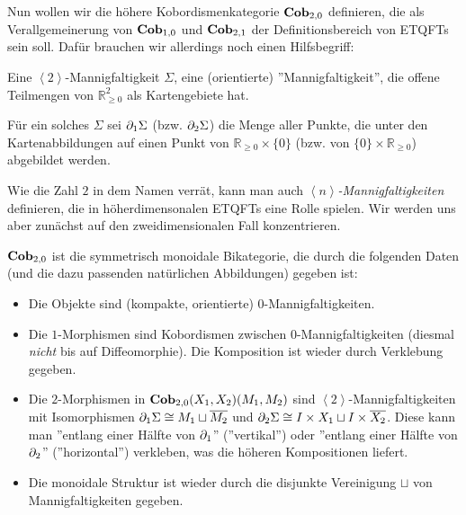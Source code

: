 

Nun wollen wir die höhere Kobordismenkategorie $\mathbf{Cob}_{2, 0}$
definieren, die als Verallgemeinerung von $\mathbf{Cob}_{1, 0}$ und
$\mathbf{Cob}_{2, 1}$ der Definitionsbereich von ETQFTs sein soll. Dafür
brauchen wir allerdings noch einen Hilfsbegriff:

\begin{Def}
Eine $\left<2\right>$-Mannigfaltigkeit $\Sigma$, eine (orientierte)
''Mannigfaltigkeit'', die offene Teilmengen von $\mathbb{R}_{\geq 0}^2$ als
Kartengebiete hat.

Für ein solches $\Sigma$ sei $\partial_1 \Sigma$ (bzw. $\partial_2 \Sigma$) die
Menge aller Punkte, die unter den Kartenabbildungen auf einen Punkt von
$\mathbb{R}_{\geq 0} \times \{0\}$ (bzw. von $\{0\} \times
\mathbb{R}_{\geq 0}$) abgebildet werden.
\end{Def}

Wie die Zahl $2$ in dem Namen verrät, kann man auch
\emph{$\left<n\right>$-Mannigfaltigkeiten} definieren, die in höherdimensonalen
ETQFTs eine Rolle spielen. Wir werden uns aber zunächst auf den
zweidimensionalen Fall konzentrieren.

\begin{Def}
$\mathbf{Cob}_{2, 0}$ ist die symmetrisch monoidale Bikategorie, die durch
die folgenden Daten (und die dazu passenden natürlichen Abbildungen) gegeben
ist:
\begin{itemize}
\item Die Objekte sind (kompakte, orientierte) $0$-Mannigfaltigkeiten.
\item Die $1$-Morphismen sind Kobordismen zwischen $0$-Mannigfaltigkeiten
(diesmal \emph{nicht} bis auf Diffeomorphie). Die Komposition ist wieder durch
Verklebung gegeben.
\item Die $2$-Morphismen in $\mathbf{Cob}_{2, 0} (X_1, X_2) (M_1, M_2)$ sind
$\left<2\right>$-Mannigfaltigkeiten mit Isomorphismen $\partial_1 \Sigma \cong M_1
\sqcup \overline{M_2}$ und $\partial_2 \Sigma \cong I \times X_1 \sqcup I \times
\overline{X_2}$. Diese kann man ''entlang einer Hälfte von $\partial_1$''
(''vertikal'') oder ''entlang einer Hälfte von $\partial_2$'' (''horizontal'')
verkleben, was die höheren Kompositionen liefert.
\item Die monoidale Struktur ist wieder durch die disjunkte Vereinigung
$\sqcup$ von Mannigfaltigkeiten gegeben.
\end{itemize}
\end{Def}

